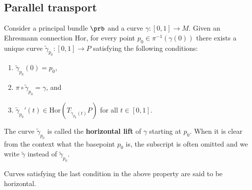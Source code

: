 \subsection{Parallel transport}

    \begin{definition}
        Consider a principal bundle $\prb$ and a curve $\gamma:[0,1]\rightarrow M$. Given an Ehresmann connection $\text{Hor}$, for every point $p_0\in \pi^{-1}(\gamma(0))$ there exists a unique curve $\widetilde{\gamma}_{p_0}:[0,1]\rightarrow P$ satisfying the following conditions:
        \begin{enumerate}
            \item $\widetilde{\gamma}_{p_0}(0) = p_0$,
            \item $\pi\circ\widetilde{\gamma}_{p_0} = \gamma$, and
            \item $\widetilde{\gamma}_{p_0}'(t)\in\text{Hor}(T_{\widetilde{\gamma}_{p_0}(t)}P)$ for all $t\in[0,1]$.
        \end{enumerate}
        The curve $\widetilde{\gamma}_{p_0}$ is called the \textbf{horizontal lift} of $\gamma$ starting at $p_0$. When it is clear from the context what the basepoint $p_0$ is, the subscript is often omitted and we write $\widetilde{\gamma}$ instead of $\widetilde{\gamma}_{p_0}$.
    \end{definition}
    \begin{remark}
        Curves satisfying the last condition in the above property are said to be horizontal.
    \end{remark}

